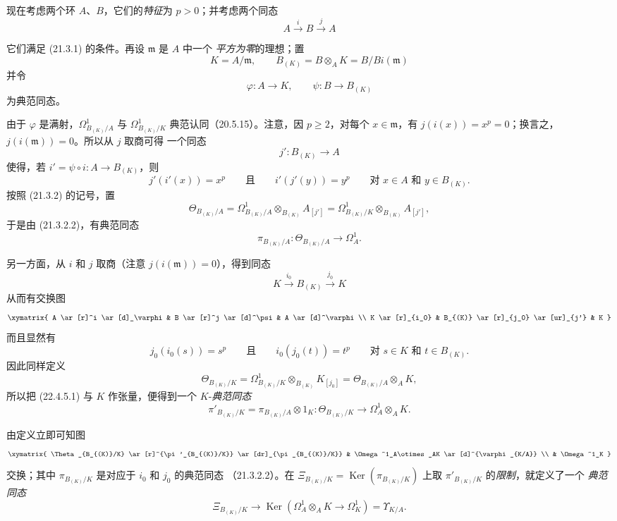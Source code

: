 \begin{env}[22.4.5]
\label{0.22.4.5-fr}
现在考虑两个环 $A$、$B$，它们的\emph{特征}为 $p>0$；并考虑两个同态
\[
  A\xrightarrow{i}B\xrightarrow{j}A
\]


它们满足 (21.3.1) 的条件。再设 $\mathfrak m$ 是 $A$ 中一个
\emph{平方为零}的理想；置
\[
  K=A/\mathfrak m,\qquad
  B_{(K)}=B\otimes_AK=B/Bi(\mathfrak m)
\]
并令
\[
  \varphi:A\longrightarrow K,\qquad
  \psi:B\longrightarrow B_{(K)}
\]
为典范同态。

由于 $\varphi$ 是满射，$\Omega^1_{B_{(K)}/A}$ 与
$\Omega^1_{B_{(K)}/K}$ 典范认同（20.5.15）。注意，因
$p\geqslant2$，对每个 $x\in\mathfrak m$，有
$j(i(x))=x^p=0$；换言之，$j(i(\mathfrak m))=0$。所以从 $j$ 取商可得
一个同态
\[
  j':B_{(K)}\longrightarrow A
\]
使得，若 $i'=\psi\circ i:A\longrightarrow B_{(K)}$，则
\[
  j'(i'(x))=x^p\qquad\text{且}\qquad i'(j'(y))=y^p
  \qquad\text{对 }x\in A\text{ 和 }y\in B_{(K)}.
\]
按照 (21.3.2) 的记号，置
\[
  \Theta_{B_{(K)}/A}
  =\Omega^1_{B_{(K)}/A}\otimes_{B_{(K)}}A_{[j']}
  =\Omega^1_{B_{(K)}/K}\otimes_{B_{(K)}}A_{[j']},
\]
于是由 (21.3.2.2)，有典范同态
\begin{equation}
\label{0.22.4.5.1-fr}
  \pi_{B_{(K)}/A}:\Theta_{B_{(K)}/A}\longrightarrow\Omega^1_A.
  \tag{22.4.5.1}
\end{equation}

另一方面，从 $i$ 和 $j$ 取商（注意 $j(i(\mathfrak m))=0$），得到同态
\[
  K\xrightarrow{i_0}B_{(K)}\xrightarrow{j_0}K
\]
从而有交换图
\[
  \xymatrix{
    A \ar[r]^i \ar[d]_\varphi & B \ar[r]^j \ar[d]^\psi & A \ar[d]^\varphi \\
    K \ar[r]_{i_0} & B_{(K)} \ar[r]_{j_0} \ar[ur]_{j'} & K
  }
\]
而且显然有
\[
  j_0(i_0(s))=s^p\qquad\text{且}\qquad i_0(j_0(t))=t^p
  \qquad\text{对 }s\in K\text{ 和 }t\in B_{(K)}.
\]
因此同样定义
\[
  \Theta_{B_{(K)}/K}
  =\Omega^1_{B_{(K)}/K}\otimes_{B_{(K)}}K_{[j_0]}
  =\Theta_{B_{(K)}/A}\otimes_AK,
\]
所以把 (22.4.5.1) 与 $K$ 作张量，便得到一个 $K$-\emph{典范同态}
\begin{equation}
\label{0.22.4.5.2-fr}
  \pi'_{B_{(K)}/K}=\pi_{B_{(K)}/A}\otimes1_K:
  \Theta_{B_{(K)}/K}\longrightarrow\Omega^1_A\otimes_AK.
  \tag{22.4.5.2}
\end{equation}


由定义立即可知图
\[
  \xymatrix{
    \Theta_{B_{(K)}/K} \ar[r]^{\pi'_{B_{(K)}/K}} \ar[dr]_{\pi_{B_{(K)}/K}}
      & \Omega^1_A\otimes_AK \ar[d]^{\varphi_{K/A}} \\
    & \Omega^1_K
  }
\]
交换；其中 $\pi_{B_{(K)}/K}$ 是对应于 $i_0$ 和 $j_0$ 的典范同态
（21.3.2.2）。在
$\Xi_{B_{(K)}/K}=\operatorname{Ker}(\pi_{B_{(K)}/K})$ 上取
$\pi'_{B_{(K)}/K}$ 的\emph{限制}，就定义了一个
\emph{典范同态}
\begin{equation}
\label{0.22.4.5.3-fr}
  \Xi_{B_{(K)}/K}\longrightarrow
  \operatorname{Ker}(\Omega^1_A\otimes_AK\longrightarrow\Omega^1_K)=\Upsilon_{K/A}.
  \tag{22.4.5.3}
\end{equation}
\end{env}

